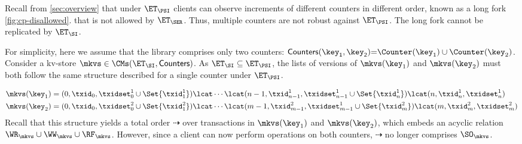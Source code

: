 Recall from \cref{sec:overview} that 
under $\ET_{\PSI}$ clients can observe 
increments of different counters in different order, 
known as a long fork \cref{fig:cp-disallowed}. that is 
not allowed by $\ET_{\SER}$. 
Thus, multiple counters are not robust against $\ET_{\PSI}$. 
The long fork cannot be replicated by $\ET_{\SI}$.

For simplicity, here we assume that the library comprises only two counters: 
$\mathsf{Counters(\key_1, \key_2)} {=} \Counter(\key_1) \cup \Counter(\key_2)$.
Consider a kv-store $\mkvs \in \CMs(\ET_{\SI}, \mathsf{Counters})$. 
As $\ET_{\SI} \subseteq \ET_{\PSI}$, the lists of versions of $\mkvs(\key_1)$ and $\mkvs(\key_2)$ 
must both follow the same structure described for a single counter under $\ET_{\PSI}$. 

\vspace{-7pt}
%
{\displaymathfont%
\begin{align}
\nonumber
\mkvs(\key_{1}) & = (0, \txid_{0}, \txidset^{1}_{0} \cup \Set{\txid^{1}_1}) 
	\lcat \cdots \lcat (n-1, \txid^{1}_{n-1}, \txidset^{1}_{n-1} \cup \Set{\txid^{1}_n})
	\lcat (n, \txid^{1}_n, \txidset^{1}_{n})\\
\mkvs(\key_{2}) & = (0, \txid_{0}, \txidset^{2}_{0} \cup \Set{\txid^{2}_1}) 
	\lcat \cdots \lcat (m-1, \txid^{2}_{m-1}, \txidset^{1}_{m-1} \cup \Set{\txid^{2}_m})
	\lcat (m, \txid^{2}_m, \txidset^{2}_{m}) \label{eq:si_counter_structure}
\end{align}
}%
Recall that this structure yields a total order $\dashrightarrow$ over transactions in $\mkvs(\key_1)$ and $\mkvs(\key_2)$, 
which embeds an acyclic relation $\WR_{\mkvs} \cup \WW_{\mkvs} \cup \RF_{\mkvs}$. 
However, since a client can now perform operations on both counters, $\dashrightarrow$ no longer comprises $\SO_{\mkvs}$. 

